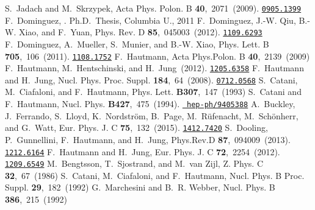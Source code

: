 \documentclass[11pt]{article} \usepackage{mystyle-new}
\begin{document}
\begin{mcbibliography}{10}
\relax
{}
S.~Jadach and M.~Skrzypek,
\newblock Acta Phys. Polon. B{} {\bf 40},~2071~(2009).
\newblock \href{http://www.arXiv.org/abs/0905.1399}{{\tt 0905.1399}}\relax
\relax
{}
F.~Dominguez,
.
\newblock Ph.D.\ Thesis, Columbia U., 2011\relax
\relax
{}
F.~Dominguez, J.-W. Qiu, B.-W. Xiao, and F.~Yuan,
\newblock Phys. Rev. D{} {\bf 85},~045003~(2012).
\newblock \href{http://www.arXiv.org/abs/1109.6293}{{\tt 1109.6293}}\relax
\relax
{}
F.~Dominguez, A.~Mueller, S.~Munier, and B.-W. Xiao,
\newblock Phys. Lett. B{} {\bf 705},~106~(2011).
\newblock \href{http://www.arXiv.org/abs/1108.1752}{{\tt 1108.1752}}\relax
\relax
{}
F.~Hautmann,
\newblock Acta Phys.Polon. B{} {\bf 40},~2139~(2009)\relax
\relax
{}
F.~Hautmann, M.~Hentschinski, and H.~Jung~(2012).
\newblock \href{http://www.arXiv.org/abs/1205.6358}{{\tt 1205.6358}}\relax
\relax
{}
F.~Hautmann and H.~Jung,
\newblock Nucl. Phys. Proc. Suppl.{} {\bf 184},~64~(2008).
\newblock \href{http://www.arXiv.org/abs/0712.0568}{{\tt 0712.0568}}\relax
\relax
{}
S.~Catani, M.~Ciafaloni, and F.~Hautmann,
\newblock Phys. Lett.{} {\bf B307},~147~(1993)\relax
\relax
{}
S.~Catani and F.~Hautmann,
\newblock Nucl. Phys.{} {\bf B427},~475~(1994).
\newblock \href{http://www.arXiv.org/abs/hep-ph/9405388}{{\tt
  hep-ph/9405388}}\relax
\relax
{}
A.~Buckley, J.~Ferrando, S.~Lloyd, K.~Nordstr{\"o}m, B.~Page, M.~R{\"u}fenacht,
  M.~Sch{\"o}nherr, and G.~Watt,
\newblock Eur. Phys. J. C{} {\bf 75},~132~(2015).
\newblock \href{http://www.arXiv.org/abs/1412.7420}{{\tt 1412.7420}}\relax
\relax
{}
S.~Dooling, P.~Gunnellini, F.~Hautmann, and H.~Jung,
\newblock Phys.Rev.D{} {\bf 87},~094009~(2013).
\newblock \href{http://www.arXiv.org/abs/1212.6164}{{\tt 1212.6164}}\relax
\relax
{}
F.~Hautmann and H.~Jung,
\newblock Eur. Phys. J. C{} {\bf 72},~2254~(2012).
\newblock \href{http://www.arXiv.org/abs/1209.6549}{{\tt 1209.6549}}\relax
\relax
{}
M.~Bengtsson, T.~Sjostrand, and M.~van Zijl,
\newblock Z. Phys. C{} {\bf 32},~67~(1986)\relax
\relax
{}
S.~Catani, M.~Ciafaloni, and F.~Hautmann,
\newblock Nucl. Phys. B Proc. Suppl.{} {\bf 29},~182~(1992)\relax
\relax
{}
G.~Marchesini and B.~R. Webber,
\newblock Nucl. Phys. B{} {\bf 386},~215~(1992)\relax
\relax

\end{mcbibliography}
\end{document}
